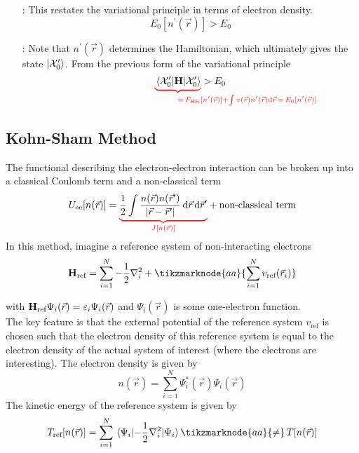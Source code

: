 \documentclass[12pt,a4paper,titlepage]{article}
\newcommand\hruleMod{%
	\vskip12pt
	\nointerlineskip
	{\color{lightgray}\leaders\vrule width \textwidth\vskip0.4pt}
	\nointerlineskip
	\vskip12pt
}
\newcommand{\aside}[3][]{ %
	\ifthenelse{\equal{#1}{}}{\hruleMod}{}
	\begin{itemize}[align=left,labelindent=0em,labelwidth=3em,labelsep*=0.5em,leftmargin=!]
		\item[\ul{#2}:]{#3}
	\end{itemize}
	\ifthenelse{\equal{#1}{}}{\hruleMod}{}
}
\newcommand{\trm}[1]{\textrm{#1}} %
\newcommand{\ul}[1]{\underline{\smash{#1}}} %
\newcommand{\Chi}{\mathcal{X}} %
\begin{document}
\aside[0]{Theorem 2}{This restates the variational principle in terms of electron density.
\begin{equation}
E_{0}[n^{\prime}(\vec{r})]>E_{0}
\end{equation}
}

\aside{Proof}{Note that $n^{\prime}(\vec{r})$ determines the Hamiltonian, which ultimately gives the state $\ket{\Chi_{0}^{\prime}}$. From the previous form of the variational principle
\begin{equation}
{\color{red}\underbrace{\color{black}\mel{\Chi_{0}^{\prime}}{\vb{H}}{\Chi_{0}^{\prime}}}_{\mathrlap{=\,F_{\trm{HK}}[n^{\prime}(\vec{r})]+\int v(\vec{r})n^{\prime}(\vec{r})\dd{\vec{r}}\,=\,E_{0}[n^{\prime}(\vec{r})]}}}>E_{0}
\end{equation}
}

\subsection{Kohn-Sham Method}
The functional describing the electron-electron interaction can be broken up into a classical Coulomb term and a non-classical term
\begin{equation}
U_{\trm{ee}}[n(\vec{r})]={\color{red}\underbrace{\color{black}\frac{1}{2}\int\frac{n(\vec{r})n(\vec{r}^{\prime})}{\abs{\vec{r}-\vec{r}^{\prime}}}\dd{\vec{r}}\dd{\vec{r}^{\prime}}}_{J[n(\vec{r})]}}+\trm{non-classical term}
\end{equation}
In this method, imagine a reference system of non-interacting electrons
\begin{equation}
\vb{H}_{\trm{ref}}=\sum_{i=1}^{N}-\frac{1}{2}\nabla_{i}^{2}+\tikzmarknode{aa}{\sum_{i=1}^{N}v_{\trm{ref}}(\vec{r}_{i})}
\end{equation}
with $\vb{H}_{\trm{ref}}\Psi_{i}(\vec{r})=\varepsilon_{i}\Psi_{i}(\vec{r})$ and $\Psi_{i}(\vec{r})$ is some one-electron function.\\

The key feature is that the external potential of the reference system $v_{\trm{ref}}$ is chosen such that the electron density of this reference system is equal to the electron density of the actual system of interest (where the electrons are interesting). The electron density is given by
\begin{equation}
n(\vec{r})=\sum_{i=1}^{N}\Psi_{i}^{*}(\vec{r})\Psi_{i}(\vec{r})
\end{equation}
The kinetic energy of the reference system is given by
\begin{equation}
T_{\trm{ref}}[n(\vec{r})]=\sum_{i=1}^{N}\mel{\Psi_{i}}{-\frac{1}{2}\nabla_{i}^{2}}{\Psi_{i}}\tikzmarknode{aa}{\neq}\,T[n(\vec{r})]
\end{equation}
\end{document}
